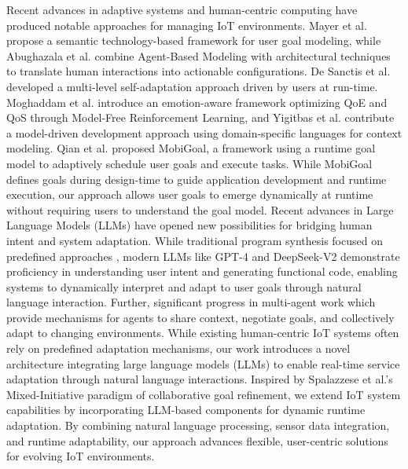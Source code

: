 



Recent advances in adaptive systems and human-centric computing have produced notable approaches for managing IoT environments. Mayer et al. \cite{7444198} propose a semantic technology-based framework for user goal modeling, while Abughazala et al. \cite{abughazala2021human} combine Agent-Based Modeling with architectural techniques to translate human interactions into actionable configurations. De Sanctis et al. \cite{de2021user} developed a multi-level self-adaptation approach driven by users at run-time. Moghaddam et al. \cite{moghaddam2023user} introduce an emotion-aware framework optimizing QoE and QoS through Model-Free Reinforcement Learning, and Yigitbas et al. \cite{yigitbas2020integrated} contribute a model-driven development approach using domain-specific languages for context modeling. 
Qian et al.\cite{7479556} proposed MobiGoal, a framework using a runtime goal model to adaptively schedule user goals and execute tasks. While MobiGoal defines goals during design-time to guide application development and runtime execution, our approach allows user goals to emerge dynamically at runtime without requiring users to understand the goal model. Recent advances in Large Language Models (LLMs) have opened new possibilities for bridging human intent and system adaptation. While traditional program synthesis focused on predefined approaches \cite{DBLP:journals/corr/RaghothamanU14}, modern LLMs like GPT-4 \cite{jiang2024selfplanningcodegenerationlarge}\cite{he2024doespromptformattingimpact} and DeepSeek-V2 \cite{deepseekai2024deepseekv2strongeconomicalefficient} demonstrate proficiency in understanding user intent and generating functional code, enabling systems to dynamically interpret and adapt to user goals through natural language interaction.
Further, significant progress in multi-agent \cite{wu2023autogenenablingnextgenllm} work which provide mechanisms for agents to share context, negotiate goals, and collectively adapt to changing environments.
While existing human-centric IoT systems often rely on predefined adaptation mechanisms, our work introduces a novel architecture integrating large language models (LLMs) to enable real-time service adaptation through natural language interactions. Inspired by Spalazzese et al.'s \cite{spalazzese2023shaping} Mixed-Initiative paradigm of collaborative goal refinement, we extend IoT system capabilities by incorporating LLM-based components for dynamic runtime adaptation. By combining natural language processing, sensor data integration, and runtime adaptability, our approach advances flexible, user-centric solutions for evolving IoT environments.